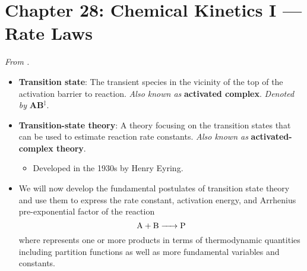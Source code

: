 \documentclass[../notes.tex]{subfiles}
\begin{document}
\section{Chapter 28: Chemical Kinetics I --- Rate Laws}
\emph{From \textcite{bib:McQuarrieSimon}.}
\begin{itemize}
    \item \textbf{Transition state}: The transient species in the vicinity of the top of the activation barrier to reaction. \emph{Also known as} \textbf{activated complex}. \emph{Denoted by} $\textbf{AB}^{\bm{\ddagger}}$.
    \item \textbf{Transition-state theory}: A theory focusing on the transition states that can be used to estimate reaction rate constants. \emph{Also known as} \textbf{activated-complex theory}.
    \begin{itemize}
        \item Developed in the 1930s by Henry Eyring.
    \end{itemize}
    \item We will now develop the fundamental postulates of transition state theory and use them to express the rate constant, activation energy, and Arrhenius pre-exponential factor of the reaction
    \begin{equation*}
        \ce{A + B -> P}
    \end{equation*}
    where  represents one or more products in terms of thermodynamic quantities including partition functions as well as more fundamental variables and constants.
    \begin{figure}[h!]
        \centering
\end{figure}
\end{itemize}
\end{document}
